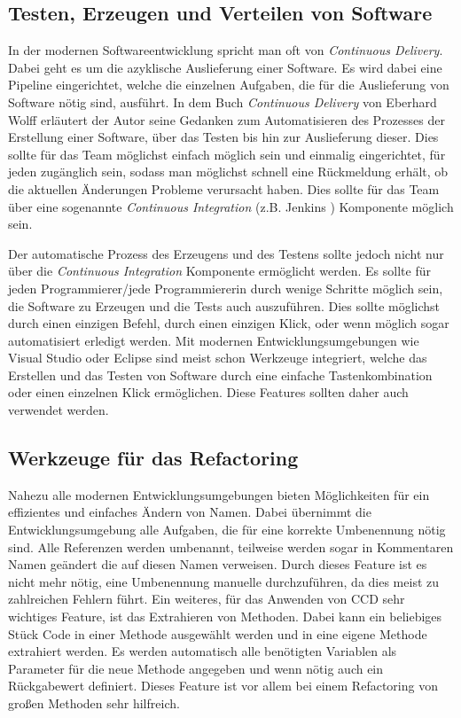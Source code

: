 \subsection{Testen, Erzeugen und Verteilen von Software}
In der modernen Softwareentwicklung spricht man oft von \textit{Continuous Delivery}. Dabei geht es um die azyklische Auslieferung einer Software. Es wird dabei eine Pipeline eingerichtet, welche die einzelnen Aufgaben, die für die Auslieferung von Software nötig sind, ausführt. In dem Buch \textit{Continuous Delivery} \cite{Wolff2014} von Eberhard Wolff erläutert der Autor seine Gedanken zum Automatisieren des Prozesses der Erstellung einer Software, über das Testen bis hin zur Auslieferung dieser. Dies sollte für das Team möglichst einfach möglich sein und einmalig eingerichtet, für jeden zugänglich sein, sodass man möglichst schnell eine Rückmeldung erhält, ob die aktuellen Änderungen Probleme verursacht haben. Dies sollte für das Team über eine sogenannte \textit{Continuous Integration} (z.B. Jenkins \cite{Jenkins2016}) Komponente möglich sein.

\SuperPar Der automatische Prozess des Erzeugens und des Testens sollte jedoch nicht nur über die \textit{Continuous Integration} Komponente ermöglicht werden. Es sollte für jeden Programmierer/jede Programmiererin durch wenige Schritte möglich sein, die Software zu Erzeugen und die Tests auch auszuführen. Dies sollte möglichst durch einen einzigen Befehl, durch einen einzigen Klick, oder wenn möglich sogar automatisiert erledigt werden. Mit modernen Entwicklungsumgebungen wie Visual Studio oder Eclipse sind meist schon Werkzeuge integriert, welche das Erstellen und das Testen von Software durch eine einfache Tastenkombination oder einen einzelnen Klick ermöglichen. Diese Features sollten daher auch verwendet werden.

\subsection{Werkzeuge für das Refactoring}
Nahezu alle modernen Entwicklungsumgebungen bieten Möglichkeiten für ein effizientes und einfaches Ändern von Namen. Dabei übernimmt die Entwicklungsumgebung alle Aufgaben, die für eine korrekte Umbenennung nötig sind. Alle Referenzen werden umbenannt, teilweise werden sogar in Kommentaren Namen geändert die auf diesen Namen verweisen. Durch dieses Feature ist es nicht mehr nötig, eine Umbenennung manuelle durchzuführen, da dies meist zu zahlreichen Fehlern führt. Ein weiteres, für das Anwenden von CCD sehr wichtiges Feature, ist das Extrahieren von Methoden. Dabei kann ein beliebiges Stück Code in einer Methode ausgewählt werden und in eine eigene Methode extrahiert werden. Es werden automatisch alle benötigten Variablen als Parameter für die neue Methode angegeben und wenn nötig auch ein Rückgabewert definiert. Dieses Feature ist vor allem bei einem Refactoring von großen Methoden sehr hilfreich.


